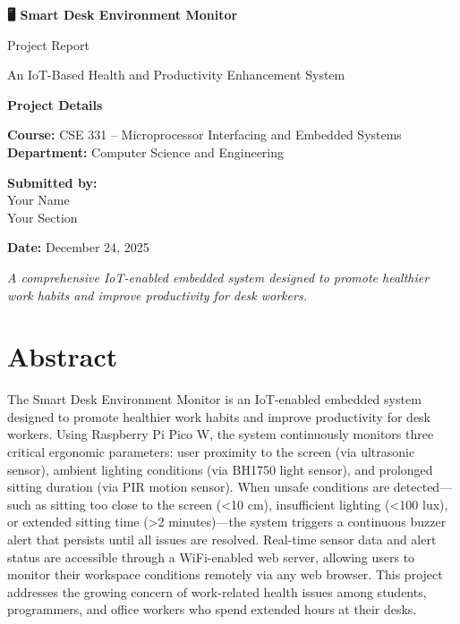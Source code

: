 \documentclass[12pt,a4paper]{article}
\begin{document}
\begin{titlepage}
\centering
\vspace*{2cm}

{\Huge \bfseries 🖥️ Smart Desk Environment Monitor \par}
\vspace{0.3cm}
{\huge Project Report \par}
\vspace{0.5cm}
{\Large An IoT-Based Health and Productivity Enhancement System\par}

\vspace{2cm}

{\large \bfseries Project Details \par}
\vspace{0.5cm}
\textbf{Course:} CSE 331 – Microprocessor Interfacing and Embedded Systems\\
\textbf{Department:} Computer Science and Engineering\\
\vspace{0.5cm}

\textbf{Submitted by:}\\
Your Name\\
Your Section\\

\vspace{2cm}

\textbf{Date:} December 24, 2025

\vfill

{\small \textit{A comprehensive IoT-enabled embedded system designed to promote healthier work habits and improve productivity for desk workers.}}

\end{titlepage}

\newpage
\tableofcontents
\listoffigures
\newpage

\section{Abstract}

The Smart Desk Environment Monitor is an IoT-enabled embedded system designed to promote healthier work habits and improve productivity for desk workers. Using Raspberry Pi Pico W, the system continuously monitors three critical ergonomic parameters: user proximity to the screen (via ultrasonic sensor), ambient lighting conditions (via BH1750 light sensor), and prolonged sitting duration (via PIR motion sensor). When unsafe conditions are detected—such as sitting too close to the screen (<10 cm), insufficient lighting (<100 lux), or extended sitting time (>2 minutes)—the system triggers a continuous buzzer alert that persists until all issues are resolved. Real-time sensor data and alert status are accessible through a WiFi-enabled web server, allowing users to monitor their workspace conditions remotely via any web browser. This project addresses the growing concern of work-related health issues among students, programmers, and office workers who spend extended hours at their desks.
\end{document}
